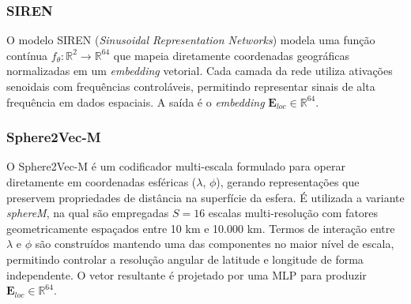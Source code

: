 

\subsubsection{SIREN}

O modelo SIREN (\textit{Sinusoidal Representation Networks}) \cite{rußwurm2024geographiclocationencodingspherical} modela uma função contínua $f_\theta : \mathbb{R}^2 \rightarrow \mathbb{R}^{64}$ que mapeia diretamente coordenadas geográficas normalizadas em um \textit{embedding} vetorial. Cada camada da rede utiliza ativações senoidais com frequências controláveis, permitindo representar sinais de alta frequência em dados espaciais. A saída é o \textit{embedding} $\mathbf{E}_{loc} \in \mathbb{R}^{64}$.

\subsubsection{Sphere2Vec-M}

O Sphere2Vec-M \cite{mai2023sphere2vecgeneralpurposelocationrepresentation} é um codificador multi-escala formulado para operar diretamente em coordenadas esféricas ($\lambda$, $\phi$), gerando representações que preservem propriedades de distância na superfície da esfera. É utilizada a variante \textit{sphereM}, na qual são empregadas $S=16$ escalas multi-resolução com fatores geometricamente espaçados entre 10 km e 10.000 km. Termos de interação entre $\lambda$ e $\phi$ são construídos mantendo uma das componentes no maior nível de escala, permitindo controlar a resolução angular de latitude e longitude de forma independente. O vetor resultante é projetado por uma MLP para produzir $\mathbf{E}_{loc} \in \mathbb{R}^{64}$.

